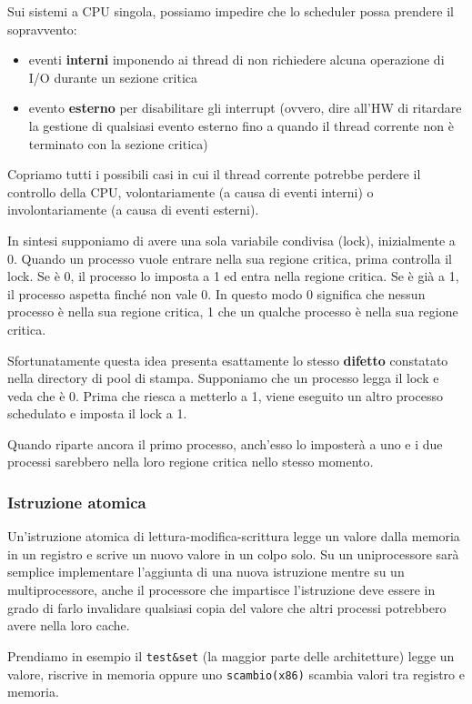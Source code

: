 \documentclass{article}
\begin{document}
Sui sistemi a CPU singola, possiamo impedire che lo scheduler possa prendere il sopravvento: 
\begin{itemize}
    \item eventi \textbf{interni} imponendo ai thread di non richiedere alcuna operazione di I/O durante un
    sezione critica
    \item evento \textbf{esterno} per disabilitare gli interrupt (ovvero, dire all'HW di ritardare la gestione di qualsiasi evento esterno fino a quando il thread corrente non è terminato con la sezione critica)
\end{itemize}
Copriamo tutti i possibili casi in cui il thread corrente potrebbe perdere il controllo della CPU, volontariamente (a causa di eventi interni) o involontariamente (a causa di eventi esterni).\par
In sintesi supponiamo di avere una sola variabile condivisa (lock), inizialmente a 0. Quando un processo vuole entrare nella sua regione critica, prima controlla il lock. Se è 0, il processo lo imposta a 1 ed entra nella regione critica. Se è già a 1, il processo aspetta finché non vale 0. In questo modo 0 significa che nessun processo è nella sua regione critica, 1 che un qualche processo è nella sua regione critica.\par
Sfortunatamente questa idea presenta esattamente lo stesso \textbf{difetto} constatato nella directory di pool di stampa. Supponiamo che un processo legga il lock e veda che è 0. Prima che riesca a metterlo a 1, viene eseguito un altro processo schedulato e imposta il lock a 1.\par
Quando riparte ancora il primo processo, anch'esso lo imposterà a uno e i due processi sarebbero nella loro regione critica nello stesso momento.

\subsubsection*{Istruzione atomica}
Un'istruzione atomica di lettura-modifica-scrittura legge un valore dalla memoria in un registro e scrive un nuovo valore in un colpo solo. Su un uniprocessore sarà semplice implementare l'aggiunta di una nuova istruzione mentre su un multiprocessore, anche il processore che impartisce l'istruzione deve essere in grado di farlo invalidare qualsiasi copia del valore che altri processi potrebbero avere nella loro cache.\par
Prendiamo in esempio il \texttt{test\&set} (la maggior parte delle architetture) legge un valore, riscrive in memoria oppure uno \texttt{scambio(x86)} scambia valori tra registro e memoria.
\end{document}
